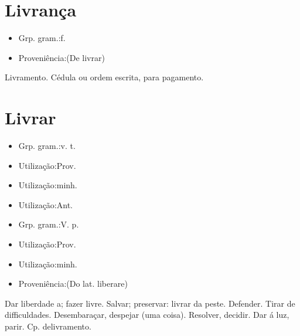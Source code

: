 \section{Livrança}
\begin{itemize}
\item {Grp. gram.:f.}
\end{itemize}
\begin{itemize}
\item {Proveniência:(De \textunderscore livrar\textunderscore )}
\end{itemize}
Livramento.
Cédula ou ordem escrita, para pagamento.
\section{Livrar}
\begin{itemize}
\item {Grp. gram.:v. t.}
\end{itemize}
\begin{itemize}
\item {Utilização:Prov.}
\end{itemize}
\begin{itemize}
\item {Utilização:minh.}
\end{itemize}
\begin{itemize}
\item {Utilização:Ant.}
\end{itemize}
\begin{itemize}
\item {Grp. gram.:V. p.}
\end{itemize}
\begin{itemize}
\item {Utilização:Prov.}
\end{itemize}
\begin{itemize}
\item {Utilização:minh.}
\end{itemize}
\begin{itemize}
\item {Proveniência:(Do lat. \textunderscore liberare\textunderscore )}
\end{itemize}
Dar liberdade a; fazer livre.
Salvar; preservar: \textunderscore livrar da peste\textunderscore .
Defender.
Tirar de difficuldades.
Desembaraçar, despejar (uma coisa).
Resolver, decidir.
Dar á luz, parir. Cp. \textunderscore delivramento\textunderscore .
